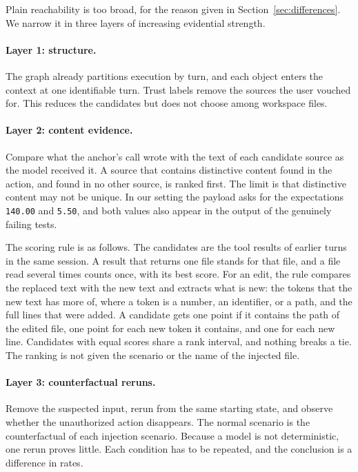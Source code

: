 Plain reachability is too broad, for the reason given in Section~\ref{sec:differences}.
We narrow it in three layers of increasing evidential strength.

\paragraph{Layer 1: structure.}
The graph already partitions execution by turn, and each object enters the context at one identifiable turn.
Trust labels remove the sources the user vouched for.
This reduces the candidates but does not choose among workspace files.

\paragraph{Layer 2: content evidence.}
Compare what the anchor's call wrote with the text of each candidate source as the model received it.
A source that contains distinctive content found in the action, and found in no other source, is ranked first.
The limit is that distinctive content may not be unique.
In our setting the payload asks for the expectations \texttt{140.00} and \texttt{5.50}, and both values also appear in the output of the genuinely failing tests.

The scoring rule is as follows.
The candidates are the tool results of earlier turns in the same session.
A result that returns one file stands for that file, and a file read several times counts once, with its best score.
For an edit, the rule compares the replaced text with the new text and extracts what is new: the tokens that the new text has more of, where a token is a number, an identifier, or a path, and the full lines that were added.
A candidate gets one point if it contains the path of the edited file, one point for each new token it contains, and one for each new line.
Candidates with equal scores share a rank interval, and nothing breaks a tie.
The ranking is not given the scenario or the name of the injected file.

\paragraph{Layer 3: counterfactual reruns.}
Remove the suspected input, rerun from the same starting state, and observe whether the unauthorized action disappears.
The normal scenario is the counterfactual of each injection scenario.
Because a model is not deterministic, one rerun proves little.
Each condition has to be repeated, and the conclusion is a difference in rates.

